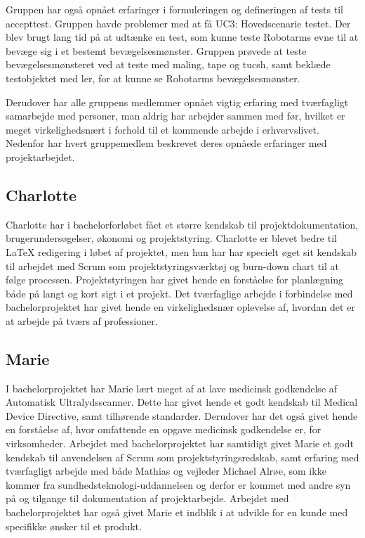 Gruppen har også opnået erfaringer i formuleringen og defineringen af tests til accepttest. Gruppen havde problemer med at få UC3: Hovedscenarie testet. Der blev brugt lang tid på at udtænke en test, som kunne teste Robotarms evne til at bevæge sig i et bestemt bevægelsesmønster. Gruppen prøvede at teste bevægelsesmønsteret ved at teste med maling, tape og tucsh, samt beklæde testobjektet med ler, for at kunne se Robotarms bevægelsesmønster. 

Derudover har alle gruppens medlemmer opnået vigtig erfaring med tværfagligt samarbejde med personer, man aldrig har arbejder sammen med før, hvilket er meget virkelighedsnært i forhold til et kommende arbejde i erhvervslivet.
Nedenfor har hvert gruppemedlem beskrevet deres opnåede erfaringer med projektarbejdet. 

\subsection{Charlotte}
Charlotte har i bachelorforløbet fået et større kendskab til projektdokumentation, brugerundersøgelser, økonomi og projektstyring. Charlotte er blevet bedre til LaTeX redigering i løbet af projektet, men hun har har specielt øget sit kendskab til arbejdet med Scrum som projektstyringsværktøj og burn-down chart til at følge processen. Projektstyringen har givet hende en forståelse for planlægning både på langt og kort sigt i et projekt. Det tværfaglige arbejde i forbindelse med bachelorprojektet har givet hende en virkelighedsnær oplevelse af, hvordan det er at arbejde på tværs af professioner. 

\subsection{Marie}
I bachelorprojektet har Marie lært meget af at lave medicinsk godkendelse af Automatisk Ultralydsscanner. Dette har givet hende et godt kendskab til Medical Device Directive, samt tilhørende standarder. Derudover har det også givet hende en forståelse af, hvor omfattende en opgave medicinsk godkendelse er, for virksomheder. Arbejdet med bachelorprojektet har samtidigt givet Marie et godt kendskab til anvendelsen af Scrum som projektstyringsredskab, samt erfaring med tværfagligt arbejde med både Mathias og vejleder Michael Alrøe, som ikke kommer fra sundhedsteknologi-uddannelsen og derfor er kommet med andre syn på og tilgange til dokumentation af projektarbejde. Arbejdet med bachelorprojektet har også givet Marie et indblik i at udvikle for en kunde med specifikke ønsker til et produkt. 


